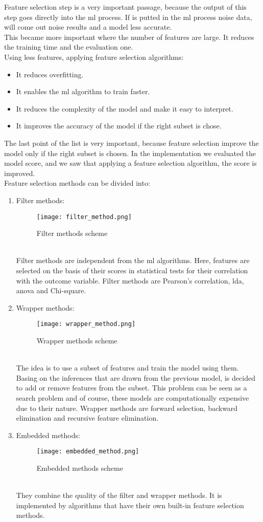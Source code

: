 Feature selection step is a very important passage, because the output of this step goes directly into the \gls{ml} process. If is putted in the \gls{ml} process noise data, will come out noise results and a model less accurate.
\\
This became more important where the number of features are large. It reduces the training time and the evaluation one.
\\
Using less features, applying feature selection algorithms:
\begin{itemize}
	\item It reduces overfitting.
	\item It enables the \gls{ml} algorithm to train faster.
	\item It reduces the complexity of the model and make it easy to interpret.
	\item It improves the accuracy of the model if the right subset is chose.
\end{itemize}
The last point of the list is very important, because feature selection improve the model only if the right subset is chosen. In the implementation we evaluated the model score, and we saw that applying a feature selection algorithm, the score is improved.
\\ \indent
Feature selection methods can be divided into:
\begin{enumerate}
	\item Filter methods:
	\begin{figure}[h]
		\centering
		\texttt{[image: filter\_method.png]}
	\caption{Filter methods scheme}
	\label{fig:filter_method}
	\end{figure}
	\\
	 Filter methods are independent from the \gls{ml} algorithms. Here, features are selected on the basis of their scores in statistical tests for their correlation with the outcome variable. Filter methods are Pearson's correlation, \gls{lda}, \gls{anova} and Chi-square.
	 \item Wrapper methods:
	 \begin{figure}[h]
		\centering
		\texttt{[image: wrapper\_method.png]}
	\caption{Wrapper methods scheme}
	\label{fig:wrapper_method}
	\end{figure}
	\\
	The idea is to use a subset of features and train the model using them. Basing on the inferences that are drawn from the previous model, is decided to add or remove features from the subset. This problem can be seen as a search problem and of course, these models are computationally expensive due to their nature. Wrapper methods are forward selection, backward elimination and recursive feature elimination.
	\item Embedded methods:
	\begin{figure}[h]
		\centering
		\texttt{[image: embedded\_method.png]}
	\caption{Embedded methods scheme}
	\label{fig:embedded_method}
	\end{figure}
	\\
	They combine the quality of the filter and wrapper methods. It is implemented by algorithms that have their own built-in feature selection methods.
\end{enumerate}
